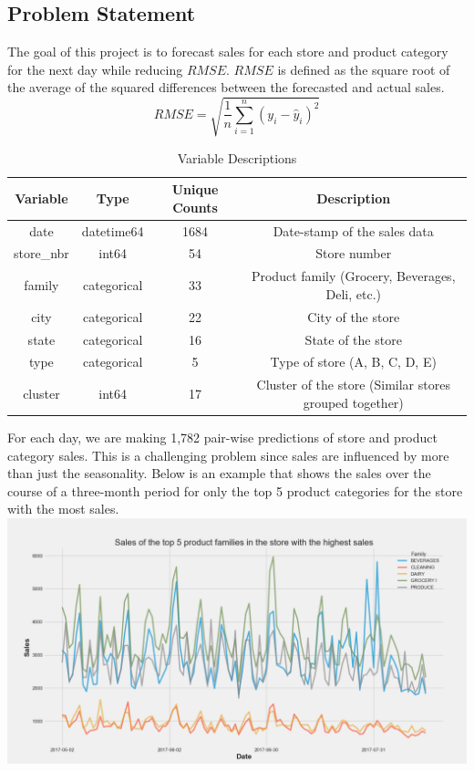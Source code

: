 \documentclass[12pt]{article}
\begin{document}
\subsection{Problem Statement}
The goal of this project is to forecast sales for each store and product category for the next day while reducing $RMSE$.
$RMSE$ is defined as the square root of the average of the squared differences between the forecasted and actual sales.
\[ RMSE = \sqrt{\frac{1}{n}\sum_{i=1}^{n}(y_i - \hat{y}_i)^2} \]
\begin{table}[H]
\centering
\begin{tabular}{|c|c|c|c|}
\hline
\textbf{Variable} & \textbf{Type} & \textbf{Unique Counts} & \textbf{Description} \\ \hline
date & datetime64 & 1684 & Date-stamp of the sales data \\ \hline
store\_nbr & int64 & 54 & Store number \\ \hline
family & categorical & 33 & Product family (Grocery, Beverages, Deli, etc.) \\ \hline
city & categorical & 22 & City of the store \\ \hline
state & categorical & 16 & State of the store \\ \hline
type & categorical & 5 & Type of store (A, B, C, D, E) \\ \hline
cluster & int64 & 17 & Cluster of the store (Similar stores grouped together) \\ \hline
\end{tabular}
\caption{Variable Descriptions}
\end{table}
For each day, we are making 1,782 pair-wise predictions of store and product category sales.
This is a challenging problem since sales are influenced by more than just the seasonality.
Below is an example that shows the sales over the course of a three-month period for only the top 5 product categories for the store with the most sales.
\\
\includegraphics[width=\textwidth]{figures/Top 5 Products.png}
\end{document}
